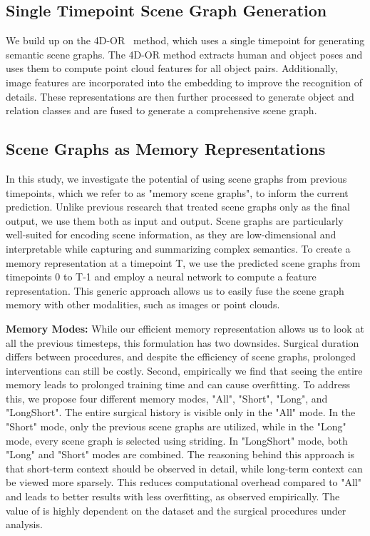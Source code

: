 \documentclass[runningheads]{llncs}
\begin{document}
\subsection{Single Timepoint Scene Graph Generation}
\label{single_timepoint}
We build up on the 4D-OR~\cite{ozsoy20224d} method, which uses a single timepoint for generating semantic scene graphs. The 4D-OR method extracts human and object poses and uses them to compute point cloud features for all object pairs. Additionally, image features are incorporated into the embedding to improve the recognition of details. These representations are then further processed to generate object and relation classes and are fused to generate a comprehensive scene graph.

\subsection{Scene Graphs as Memory Representations}
\label{memory_sg}
In this study, we investigate the potential of using scene graphs from previous timepoints, which we refer to as "memory scene graphs", to inform the current prediction. Unlike previous research that treated scene graphs only as the final output, we use them both as input and output. Scene graphs are particularly well-suited for encoding scene information, as they are low-dimensional and interpretable while capturing and summarizing complex semantics. To create a memory representation at a timepoint T, we use the predicted scene graphs from timepoints 0 to T-1 and employ a neural network to compute a feature representation. This generic approach allows us to easily fuse the scene graph memory with other modalities, such as images or point clouds.

\noindent \textbf{Memory Modes:} While our efficient memory representation allows us to look at all the previous timesteps, this formulation has two downsides. Surgical duration differs between procedures, and despite the efficiency of scene graphs, prolonged interventions can still be costly. Second, empirically we find that seeing the entire memory leads to prolonged training time and can cause overfitting. To address this, we propose four different memory modes, "All", "Short", "Long", and "LongShort". The entire surgical history is visible only in the "All" mode. In the "Short" mode, only the previous  scene graphs are utilized, while in the "Long" mode, every  scene graph is selected using striding. In "LongShort" mode, both "Long" and "Short" modes are combined. The reasoning behind this approach is that short-term context should be observed in detail, while long-term context can be viewed more sparsely. This reduces computational overhead compared to "All" and leads to better results with less overfitting, as observed empirically. The value of  is highly dependent on the dataset and the surgical procedures under analysis.
\end{document}

